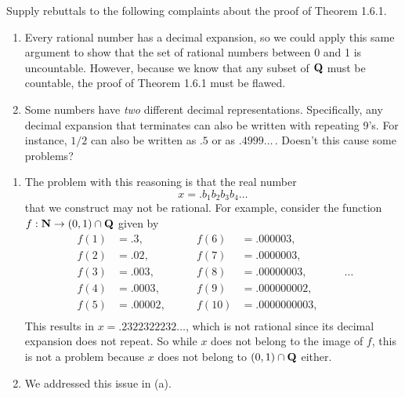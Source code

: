 \documentclass{lew98_solutions}
\begin{document}
\begin{exercise}
\label{ex:1.6.3}
    Supply rebuttals to the following complaints about the proof of Theorem 1.6.1.
    \begin{enumerate}
        \item Every rational number has a decimal expansion, so we could apply this same argument to show that the set of rational numbers between 0 and 1 is uncountable. However, because we know that any subset of \( \mathbf{Q} \) must be countable, the proof of Theorem 1.6.1 must be flawed.

        \item Some numbers have \textit{two} different decimal representations. Specifically, any decimal expansion that terminates can also be written with repeating 9's. For instance, \( 1/2 \) can also be written as \( .5 \) or as \( .4999 \ldots \, \). Doesn't this cause some problems?
    \end{enumerate}
\end{exercise}

\begin{solution}
    \begin{enumerate}
        \item The problem with this reasoning is that the real number
        \[
            x = .b_1 b_2 b_3 b_4 \ldots
        \]
        that we construct may not be rational. For example, consider the function \( f : \mathbf{N} \to (0, 1) \cap \mathbf{Q} \) given by
        \[
        \begin{aligned}
            f(1) &= .3, \\
            f(2) &= .02, \\
            f(3) &= .003, \\
            f(4) &= .0003, \\
            f(5) &= .00002, \\
        \end{aligned}
        \qquad
        \begin{aligned}
            f(6) &= .000003, \\
            f(7) &= .0000003, \\
            f(8) &= .00000003, \\
            f(9) &= .000000002, \\
            f(10) &= .0000000003, \\
        \end{aligned}
        \qquad \cdots
        \]
        This results in \( x = .2322322232 \ldots \), which is not rational since its decimal expansion does not repeat. So while \( x \) does not belong to the image of \( f \), this is not a problem because \( x \) does not belong to \( (0, 1) \cap \mathbf{Q} \) either.

        \item We addressed this issue in  (a).
    \end{enumerate}
\end{solution}
\end{document}
